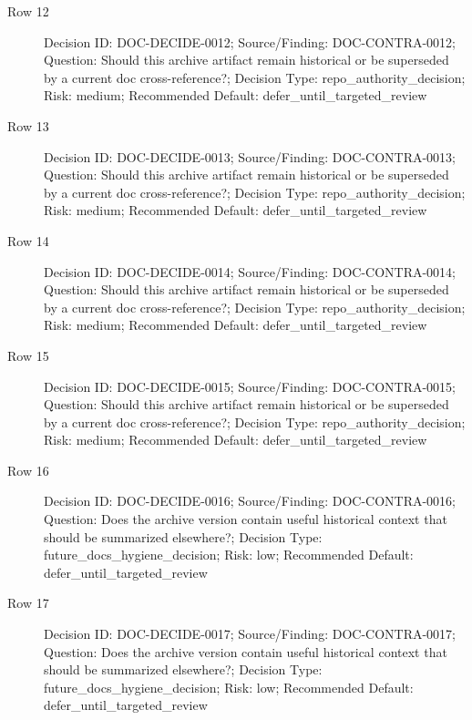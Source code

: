 \documentclass[9pt,a4paper,openany]{book}
\begin{document}
\begin{description}
\item[Row 12] Decision ID: DOC-\allowbreak{}DECIDE-\allowbreak{}0012; Source/\allowbreak{}Finding: DOC-\allowbreak{}CONTRA-\allowbreak{}0012; Question: Should this archive artifact remain historical or be superseded by a current doc cross-\allowbreak{}reference?; Decision Type: repo\_\allowbreak{}authority\_\allowbreak{}decision; Risk: medium; Recommended Default: defer\_\allowbreak{}until\_\allowbreak{}targeted\_\allowbreak{}review
\item[Row 13] Decision ID: DOC-\allowbreak{}DECIDE-\allowbreak{}0013; Source/\allowbreak{}Finding: DOC-\allowbreak{}CONTRA-\allowbreak{}0013; Question: Should this archive artifact remain historical or be superseded by a current doc cross-\allowbreak{}reference?; Decision Type: repo\_\allowbreak{}authority\_\allowbreak{}decision; Risk: medium; Recommended Default: defer\_\allowbreak{}until\_\allowbreak{}targeted\_\allowbreak{}review
\item[Row 14] Decision ID: DOC-\allowbreak{}DECIDE-\allowbreak{}0014; Source/\allowbreak{}Finding: DOC-\allowbreak{}CONTRA-\allowbreak{}0014; Question: Should this archive artifact remain historical or be superseded by a current doc cross-\allowbreak{}reference?; Decision Type: repo\_\allowbreak{}authority\_\allowbreak{}decision; Risk: medium; Recommended Default: defer\_\allowbreak{}until\_\allowbreak{}targeted\_\allowbreak{}review
\item[Row 15] Decision ID: DOC-\allowbreak{}DECIDE-\allowbreak{}0015; Source/\allowbreak{}Finding: DOC-\allowbreak{}CONTRA-\allowbreak{}0015; Question: Should this archive artifact remain historical or be superseded by a current doc cross-\allowbreak{}reference?; Decision Type: repo\_\allowbreak{}authority\_\allowbreak{}decision; Risk: medium; Recommended Default: defer\_\allowbreak{}until\_\allowbreak{}targeted\_\allowbreak{}review
\item[Row 16] Decision ID: DOC-\allowbreak{}DECIDE-\allowbreak{}0016; Source/\allowbreak{}Finding: DOC-\allowbreak{}CONTRA-\allowbreak{}0016; Question: Does the archive version contain useful historical context that should be summarized elsewhere?; Decision Type: future\_\allowbreak{}docs\_\allowbreak{}hygiene\_\allowbreak{}decision; Risk: low; Recommended Default: defer\_\allowbreak{}until\_\allowbreak{}targeted\_\allowbreak{}review
\item[Row 17] Decision ID: DOC-\allowbreak{}DECIDE-\allowbreak{}0017; Source/\allowbreak{}Finding: DOC-\allowbreak{}CONTRA-\allowbreak{}0017; Question: Does the archive version contain useful historical context that should be summarized elsewhere?; Decision Type: future\_\allowbreak{}docs\_\allowbreak{}hygiene\_\allowbreak{}decision; Risk: low; Recommended Default: defer\_\allowbreak{}until\_\allowbreak{}targeted\_\allowbreak{}review

\end{description}
\end{document}
